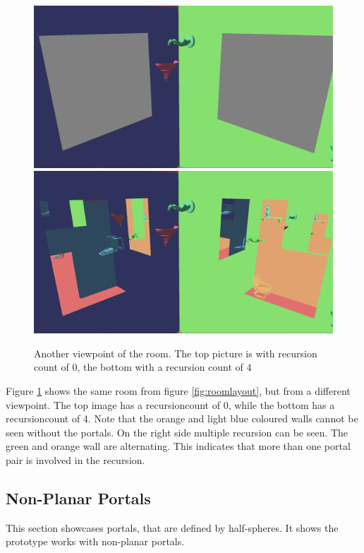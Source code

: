 \begin{figure}[H]
	\includegraphics[width=\linewidth]{images/roomportalsr0.png}
	\includegraphics[width=\linewidth]{images/roomportals.png}
	\caption{Another viewpoint of the room. The top picture is with recursion count of 0, the bottom with a recursion count of 4}
	\label{fig:room}
\end{figure}


Figure \ref{fig:room} shows the same room from figure \ref{fig:roomlayout}, but from a different viewpoint. The top image has a \gls{recursioncount} of 0, while the bottom has a \gls{recursioncount} of 4. Note that the orange and light blue coloured walls cannot be seen without the portals. On the right side multiple recursion can be seen. The green and orange wall are alternating. This indicates that more than one portal pair is involved in the recursion.

\subsection{Non-Planar Portals}
\label{section:nonplanar}

This section showcases portals, that are defined by half-spheres. It shows the prototype works with non-planar portals.

